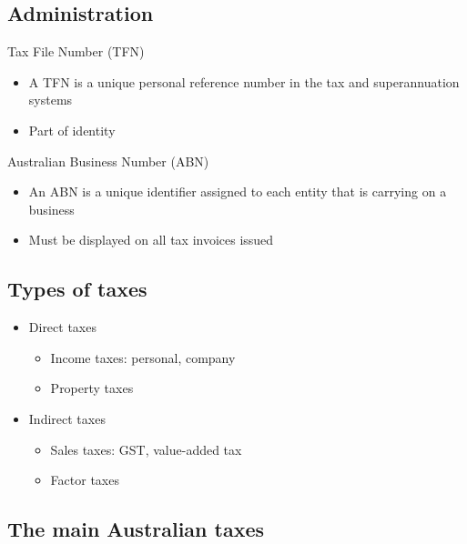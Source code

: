\documentclass{article}
\begin{document}
	\subsection{Administration}
		
		Tax File Number (TFN)
			\begin{itemize}
				\item A TFN is a unique personal reference number in the tax and superannuation systems
				\item Part of identity
			\end{itemize}

		Australian Business Number (ABN)
			\begin{itemize}
				\item An ABN is a unique identifier assigned to each entity that is carrying on a business
				\item Must be displayed on all tax invoices issued
			\end{itemize}

	\subsection{Types of taxes}

		\begin{itemize}
			\item Direct taxes
				\begin{itemize}
					\item Income taxes: personal, company
					\item Property taxes
				\end{itemize}
			\item Indirect taxes
				\begin{itemize}
					\item Sales taxes: GST, value-added tax
					\item Factor taxes
				\end{itemize}
		\end{itemize}

	\subsection{The main Australian taxes}
\end{document}
